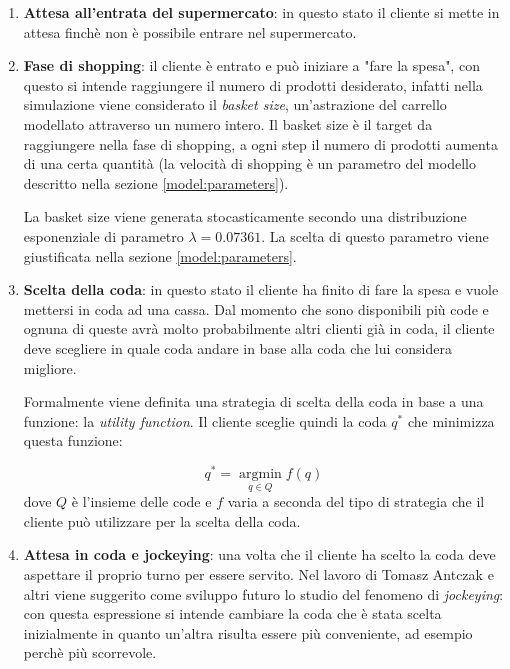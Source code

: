 \begin{enumerate}
	\item \textbf{Attesa all'entrata del supermercato}: in questo stato il cliente si mette in attesa finchè non è possibile entrare nel supermercato.
	\item \textbf{Fase di shopping}: il cliente è entrato e può
          iniziare a "fare la spesa", con questo si intende
          raggiungere il numero di prodotti desiderato, infatti nella
          simulazione viene considerato il \textit{basket size},
          un'astrazione del carrello modellato attraverso un numero
          intero. Il basket size è il target da raggiungere nella fase
          di shopping, a ogni step il numero di prodotti aumenta di
          una certa quantità (la velocità di shopping è un parametro
          del modello descritto nella sezione \ref{model:parameters}).
	
	La basket size viene generata stocasticamente secondo una distribuzione esponenziale di parametro $\lambda = 0.07361$. La scelta di questo parametro viene giustificata nella sezione \ref{model:parameters}. 
	
	\item \textbf{Scelta della coda}: in questo stato il cliente ha finito di fare la spesa e vuole mettersi in coda ad una cassa. Dal momento che sono disponibili più code e ognuna di queste avrà molto probabilmente altri clienti già in coda, il cliente deve scegliere in quale coda andare in base alla coda che lui considera migliore.
	
	Formalmente viene definita una strategia di scelta della coda in base a una funzione: la \textit{utility function}. Il cliente sceglie quindi la coda $q^*$ che minimizza questa funzione:

	\begin{equation}
		q^* = \operatorname*{argmin}_{q \in Q} f(q) \label{eq:strategy}
	\end{equation}
	dove $Q$ è l'insieme delle code e $f$ varia a seconda del tipo di strategia che il cliente può utilizzare per la scelta della coda.

	\item \textbf{Attesa in coda e jockeying}: una volta che il cliente ha scelto la coda deve aspettare il proprio turno per essere servito. Nel lavoro di Tomasz Antczak e altri \cite{article1} viene suggerito come sviluppo futuro lo studio del fenomeno di \textit{jockeying}: con questa espressione si intende cambiare la coda che è stata scelta inizialmente in quanto un'altra risulta essere più conveniente, ad esempio perchè più scorrevole.
	

\end{enumerate}
